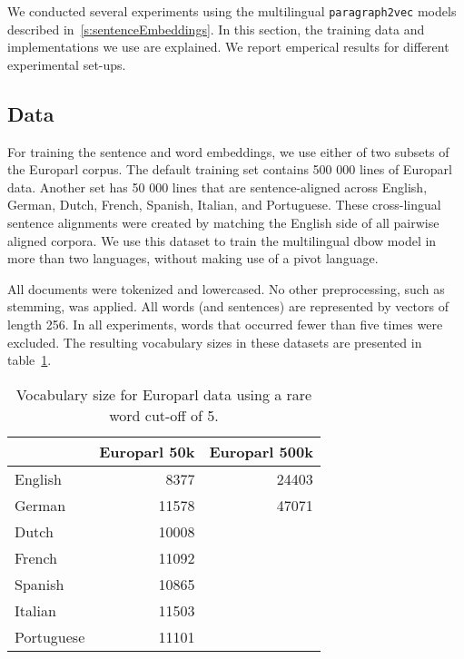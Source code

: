 
We conducted several experiments using the multilingual \texttt{paragraph2vec} models described in~\ref{s:sentenceEmbeddings}. In this section, the training data and implementations we use are explained. We report emperical results for different experimental set-ups.



\subsection{Data}

For training the sentence and word embeddings, we use either of two subsets of the Europarl corpus.
The default training set contains 500 000 lines of Europarl data.
Another set has 50 000 lines that are sentence-aligned across English, German, Dutch, French, Spanish, Italian, and Portuguese.
These cross-lingual sentence alignments were created by matching the English side of all pairwise aligned corpora.
We use this dataset to train the multilingual dbow model in more than two languages, without making use of a pivot language.

All documents were tokenized and lowercased. No other preprocessing, such as stemming, was applied.
All words (and sentences) are represented by vectors of length 256.
In all experiments, words that occurred fewer than five times were excluded.
The resulting vocabulary sizes in these datasets are presented  in table~\ref{t:vocabularies}.

\begin{table}
\center
\begin{tabular}{l| r r}
		&Europarl 50k 	&Europarl 500k\\\hline
English	&8377			&24403	\\	
German	&11578		&47071	\\
Dutch		&10008				\\
French	&11092				\\	
Spanish	&10865				\\
Italian		&11503				\\
Portuguese	&11101				\\
\end{tabular}
\caption{Vocabulary size for Europarl data using a rare word cut-off of 5.}
\label{t:vocabularies}
\end{table}


